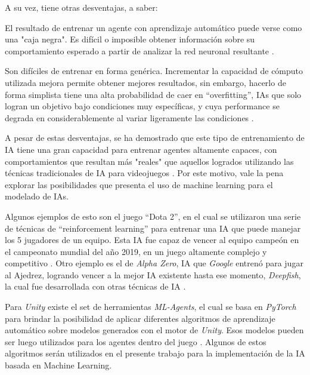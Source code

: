 \documentclass[a4paper]{article}
\begin{document}
A su vez, tiene otras desventajas, a saber:

El resultado de entrenar un agente con aprendizaje automático puede verse como una "caja negra". Es difícil o imposible obtener información sobre su comportamiento esperado a partir de analizar la red neuronal resultante \cite{deep_learning_black_box_problem}.

Son difíciles de entrenar en forma genérica. Incrementar la capacidad de cómputo utilizada mejora permite obtener mejores resultados, sin embargo, hacerlo de forma simplista tiene una alta probabilidad de caer en “overfitting”, IAs que solo logran un objetivo bajo condiciones muy específicas, y cuya performance se degrada en considerablemente al variar ligeramente las condiciones \cite{an_evaluation_of_the_unity_machine_learning_agents_toolkit}.

A pesar de estas desventajas, se ha demostrado que este tipo de entrenamiento de IA tiene una gran capacidad para entrenar agentes altamente capaces, con comportamientos que resultan más "reales" que aquellos logrados utilizando las técnicas tradicionales de IA para videojuegos \cite{a_study_on_overfitting_in_deep_reinforcement_learning}. Por este motivo, vale la pena explorar las posibilidades que presenta el uso de machine learning para el modelado de IAs.

Algunos ejemplos de esto son el juego “Dota 2”, en el cual se utilizaron una serie de técnicas de “reinforcement learning” para entrenar una IA que puede manejar los 5 jugadores de un equipo. Esta IA fue capaz de vencer al equipo campeón en el campeonato mundial del año 2019, en un juego altamente complejo y competitivo \cite{dota_2_with_large_scale_deep_reinforcement_learning}. Otro ejemplo es el de \textit{Alpha Zero}, IA que \textit{Google} entrenó para jugar al Ajedrez, logrando vencer a la mejor IA existente hasta ese momento, \textit{Deepfish}, la cual fue desarrollada con otras técnicas de IA \cite{ai_in_human-computer_gaming}.

Para \textit{Unity} existe el set de herramientas \textit{ML-Agents}, el cual se basa en \textit{PyTorch} para brindar la posibilidad de aplicar diferentes algoritmos de aprendizaje automático sobre modelos generados con el motor de \textit{Unity}. Esos modelos pueden ser luego utilizados para los agentes dentro del juego \cite{an_evaluation_of_the_unity_machine_learning_agents_toolkit}. Algunos de estos algoritmos serán utilizados en el presente trabajo para la implementación de la IA basada en Machine Learning.
\end{document}
